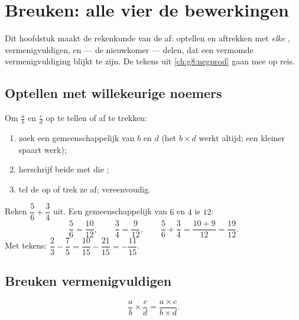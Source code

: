\chapter{Breuken: alle vier de bewerkingen}\label{ch:g8:fractions}

Dit hoofdstuk maakt de rekenkunde van de  af: optellen en aftrekken met
\emph{elke} , vermenigvuldigen, en --- de nieuwkomer --- delen, dat een
vermomde vermenigvuldiging blijkt te zijn. De tekens uit \cref{ch:g8:negprod} gaan
mee op reis.

\section{Optellen met willekeurige noemers}

\begin{method}\label{met:g8:fractions:add}
Om $\frac ab$ en $\frac cd$ op te tellen of af te trekken:
\begin{enumerate}
  \item zoek een gemeenschappelijk  van $b$ en $d$ (het 
        $b \times d$ werkt altijd; een kleiner  spaart werk);
  \item herschrijf beide  met die ;
  \item tel de  op of trek ze af; vereenvoudig.
\end{enumerate}
\end{method}

\begin{example}\label{ex:g8:fractions:add}
Reken $\dfrac{5}{6} + \dfrac{3}{4}$ uit. Een gemeenschappelijk  van $6$ en
$4$ is $12$:
\[
\frac{5}{6} = \frac{10}{12},
\qquad
\frac{3}{4} = \frac{9}{12},
\qquad
\frac{5}{6} + \frac{3}{4} = \frac{10 + 9}{12} = \frac{19}{12}.
\]
Met tekens: $\dfrac{2}{3} - \dfrac{7}{5} = \dfrac{10}{15} - \dfrac{21}{15} =
-\dfrac{11}{15}$.
\end{example}

\section{Breuken vermenigvuldigen}

\begin{theorem}\label{thm:g8:fractions:mult}
\[
\frac{a}{b} \times \frac{c}{d} = \frac{a \times c}{b \times d} .
\]
\end{theorem}

